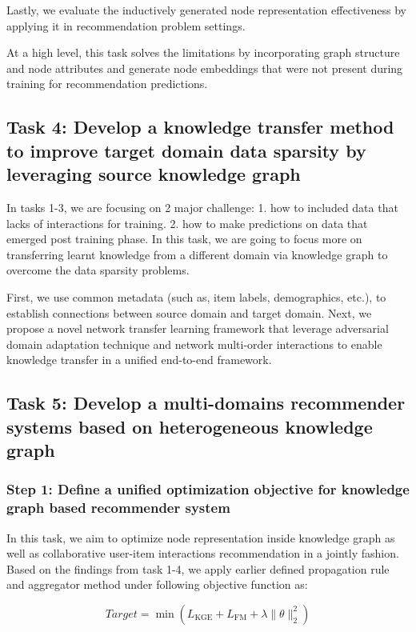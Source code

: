 Lastly, we evaluate the inductively generated node representation effectiveness by applying it in recommendation problem settings. 

At a high level, this task solves the limitations by incorporating graph structure and node attributes and generate node embeddings that were not present during training for recommendation predictions.


\subsection*{Task 4: Develop a knowledge transfer method to improve target domain data sparsity by leveraging source knowledge graph }

In tasks 1-3, we are focusing on 2 major challenge: 1. how to included data that lacks of interactions for training. 2. how to make predictions on data that emerged post training phase. In this task, we are going to focus more on transferring learnt knowledge from a different domain via knowledge graph to overcome the data sparsity problems.

First, we use common metadata (such as, item labels, demographics, etc.), to establish connections between source domain and target domain. 
Next, we propose a novel network transfer learning framework that leverage  adversarial domain adaptation technique and network multi-order interactions to enable knowledge transfer in a unified end-to-end framework. 

\subsection*{Task 5: Develop a multi-domains recommender systems based on heterogeneous knowledge graph}

\subsubsection*{Step 1: Define a unified optimization objective for knowledge graph based recommender system}
In this task, we aim to optimize node representation inside knowledge graph as well as collaborative user-item interactions recommendation in a jointly fashion.
Based on the findings from task 1-4, we apply earlier defined propagation rule and aggregator method under following objective function as:

\begin{equation}
    Target=\min{(L_\text{KGE}+L_\text{FM}+\lambda\|\theta\|^2_2)}
\end{equation}

